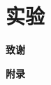 \documentclass[zihao = -4,cn]{oucart}
\begin{document}
\section{实验}

\newpage
%


\newpage
\begin{center}
 \textbf{致谢} \\
\end{center}

\newpage
\begin{center}
 \textbf{附录} \\
\end{center}
\end{document}
